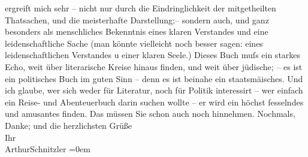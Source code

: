 \begin{ledgroupsized}[t]{13cm}
               ergreift mich sehr – nicht nur durch die Eindringlichkeit der mitgetheilten
               Thatsachen, und die meisterhafte Darstellung;– sondern auch, und ganz besonders als
               menschliches Bekenntnis eines klaren Verstandes und eine leidenschaftliche Sache (man
               könnte vielleicht noch besser sagen: eines leidenschaftlichen Verstandes u einer
               klaren Seele.) Dieses Buch
               muſs ein starkes Echo, weit über literarische Kreise hinaus finden, und weit über
               jüdische; – es ist ein politisches Buch im guten Sinn – denn es ist beinahe ein
                  staatsmä{\geminationn}isches. Und ich glaube, wer sich weder für
               Literatur, noch {\pb}für Politik interessirt –
               wer einfach ein Reise- und Abenteuerbuch darin \strikeout{\textcolor{gray}{finden}} suchen wollte – er wird ein höchst fesselndes und amusantes \strikeout{\textcolor{gray}{darin}} finden. Das müssen Sie schon
               auch noch hinnehmen.\pend
           \pstart
           Nochmals, Danke; und die herzlichsten Grüße {\\[\baselineskip]}Ihr {\\[\baselineskip]}\spacefill\mbox{ArthurSchnitzler}\pend
           \leftskip=0em{}
         
         \endnumbering{}\end{ledgroupsized}  \newcommand{\dateiname}{L03021}\newcommand{\titel}{Arthur Schnitzler an Felix Salten, 6. 5. 1925}\newcommand{\editorInnen}{Martin Anton Müller und Laura Untner}
      